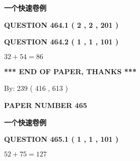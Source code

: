 \documentclass{ctexart}
\begin{document}
   
   
   
   
   
 \vspace{0.2in}
{\LARGE {\textbf{ 一个快速卷例}}}
   
   
  
\vspace{0.2in}
  
{\textbf{\Large{QUESTION
464.1 
 ( 2 , 2 , 201 )
}}}
  
  
  
\vspace{0.2in}
  
{\textbf{\Large{QUESTION
464.2 
 ( 1 , 1 , 101 )
}}}
  
  
 
 

$ %
32 +  %
54=   %
86$
 
 
   
   
 \vspace{0.2in}
 
   
   
   
   
\vspace{1.0in} 
{\textbf{\large{ *** END OF PAPER, THANKS *** }}} 
   
   
\hspace{1.0in} By: 
 239 ( 416 ,  613 )
   
   
   
   
\newpage 
\setcounter{page}{ 
   465001 } 
   
   
   
   
 {\textbf{ \Large{ PAPER NUMBER  465  }}}
   
   
\vspace{0.2in}
   
   
   
   
   
   
 \vspace{0.2in}
{\LARGE {\textbf{ 一个快速卷例}}}
   
   
  
\vspace{0.2in}
  
{\textbf{\Large{QUESTION
465.1 
 ( 1 , 1 , 101 )
}}}
  
  
 
 

$ %
52 +  %
75=   %
127$
 
\end{document}
